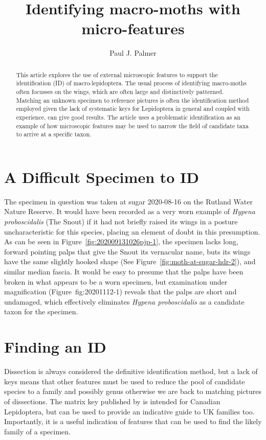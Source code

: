 \documentclass[]{article}
\title{Identifying macro-moths with micro-features}
\author{Paul J. Palmer}
\begin{document}
\maketitle

\begin{abstract}

This article explores the use of external microscopic features to support the identification (ID) of  macro-lepidoptera. The usual process of identifying macro-moths often focusses on the wings, which are often large and distinctively patterned. Matching an unknown specimen to reference pictures is often the identification method employed given the lack of systematic keys for Lepidoptera in general and coupled with experience, can give good results. The article uses a problematic identification as an example of how microscopic features may be used to narrow the field of candidate taxa to arrive at a specific taxon. 

\end{abstract}

\section*{A Difficult Specimen to ID}
The specimen in question was taken at sugar 2020-08-16 on the Rutland Water Nature Reserve. It would have been recorded as a very worn example of \textit{Hypena proboscidalis} (The Snout) if it had not briefly raised its wings in a posture uncharacteristic for this species, placing an element of doubt in this presumption. As can be seen in Figure~\ref{fig:202009131026pjp-1}, the specimen lacks long, forward pointing palps that give the Snout its vernacular name, buts its wings have the same slightly hooked shape (See Figure~\ref{fig:moth-at-sugar-hdr-2}), and similar median fascia. It would be easy to presume that the palps have been broken in what appears to be a worn specimen, but examination under magnification (Figure~fig:20201112-1) reveals that the palps are short and undamaged, which effectively eliminates \textit{Hypena proboscidalis} as a candidate taxon for the specimen.

\section*{Finding an ID}
Dissection is always considered the definitive identification method, but a lack of keys means that other features must be used to reduce the pool of candidate species to a family and possibly genus otherwise we are back to matching pictures of dissections.  The matrix key published by \citet{Dombroskie2011} is intended for Canadian Lepidoptera, but can be used to provide an indicative guide to UK families too. Importantly, it is a useful indication of features that can be used to find the likely family of a specimen.
\end{document}
